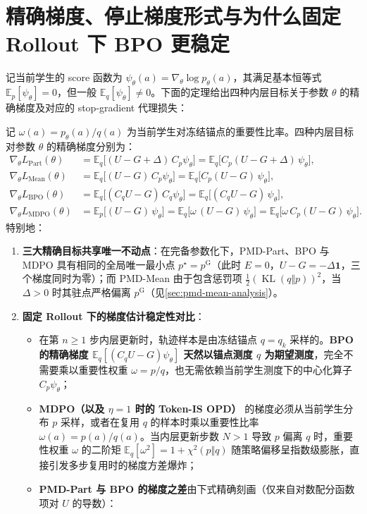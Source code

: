 \documentclass[lang=cn,scheme=chinese,openany]{../book/elegantbook}
\newcommand{\E}{\mathbb E}
\newcommand{\KL}{\operatorname{KL}}
\begin{document}
\section{精确梯度、停止梯度形式与为什么固定 Rollout 下 BPO 更稳定}
\label{sec:four-inner-comparison}

记当前学生的 score 函数为 $\psi_\theta(a)=\nabla_\theta\log p_\theta(a)$，其满足基本恒等式 $\E_p[\psi_\theta]=0$，但一般 $\E_q[\psi_\theta]\ne 0$。下面的定理给出四种内层目标关于参数 $\theta$ 的精确梯度及对应的 stop-gradient 代理损失：

\begin{theorem}[四种内层目标的精确梯度与共同不动点]
\label{thm:ch2-inner-common-root}
记 $\omega(a)=p_\theta(a)/q(a)$ 为当前学生对冻结锚点的重要性比率。四种内层目标对参数 $\theta$ 的精确梯度分别为：
\begin{align}
 \nabla_\theta L_{\mathrm{Part}}(\theta)
 &= \E_q\bigl[(U-G+\Delta)\,C_p\psi_\theta\bigr]
 = \E_q\bigl[C_p(U-G+\Delta)\,\psi_\theta\bigr], \label{eq:grad-part}\\
 \nabla_\theta L_{\mathrm{Mean}}(\theta)
 &= \E_q\bigl[(U-G)\,C_p\psi_\theta\bigr]
 = \E_q\bigl[C_p(U-G)\,\psi_\theta\bigr], \label{eq:grad-mean}\\
 \nabla_\theta L_{\mathrm{BPO}}(\theta)
 &= \E_q\bigl[(C_q U-G)\,C_q\psi_\theta\bigr]
 = \E_q\bigl[(C_q U-G)\,\psi_\theta\bigr], \label{eq:grad-bpo}\\
 \nabla_\theta L_{\mathrm{MDPO}}(\theta)
 &= \E_p\bigl[(U-G)\,\psi_\theta\bigr]
 = \E_q\bigl[\omega\,(U-G)\,\psi_\theta\bigr]
 = \E_q\bigl[\omega\,C_p(U-G)\,\psi_\theta\bigr]. \label{eq:grad-mdpo}
\end{align}
特别地：
\begin{enumerate}
 \item \textbf{三大精确目标共享唯一不动点}：在完备参数化下，PMD-Part、BPO 与 MDPO 具有相同的全局唯一最小点 $p^\star=p^{\mathrm G}$（此时 $E=0$，$U-G=-\Delta\mathbf 1$，三个梯度同时为零）；而 PMD-Mean 由于包含惩罚项 $\frac12(\KL(q\Vert p))^2$，当 $\Delta>0$ 时其驻点严格偏离 $p^{\mathrm G}$（见\cref{sec:pmd-mean-analysis}）。
 \item \textbf{固定 Rollout 下的梯度估计稳定性对比}：
 \begin{itemize}
  \item 在第 $n\ge 1$ 步内层更新时，轨迹样本是由冻结锚点 $q=q_k$ 采样的。\textbf{BPO 的精确梯度 $\E_q[(C_q U-G)\psi_\theta]$ 天然以锚点测度 $q$ 为期望测度}，完全不需要乘以重要性权重 $\omega=p/q$，也无需依赖当前学生测度下的中心化算子 $C_p\psi_\theta$；
  \item \textbf{MDPO（以及 $\eta=1$ 时的 Token-IS OPD）} 的梯度必须从当前学生分布 $p$ 采样，或者在复用 $q$ 的样本时乘以重要性比率 $\omega(a)=p(a)/q(a)$。当内层更新步数 $N>1$ 导致 $p$ 偏离 $q$ 时，重要性权重 $\omega$ 的二阶矩 $\E_q[\omega^2]=1+\chi^2(p\Vert q)$ 随策略偏移呈指数级膨胀，直接引发多步复用时的梯度方差爆炸；
  \item \textbf{PMD-Part 与 BPO 的梯度之差}由下式精确刻画（仅来自对数配分函数项对 $U$ 的导数）：
 \end{itemize}
\end{enumerate}
\end{theorem}
\end{document}
